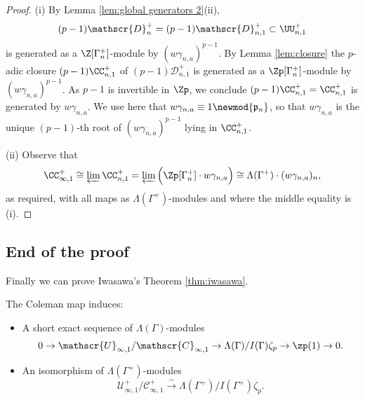 \documentclass[a4paper,10pt, english, reqno]{smfart}
\newcommand{\GG}{\Gamma}
\numberwithin{equation}{section}
\begin{document}
\begin{proof}
(i) By Lemma \ref{lem:global generators 2}(ii), 
\[
    (p-1)\mathscr{D}_{n}^+ = (p-1)\mathscr{D}_{n,1}^+ \subset \UU_{n,1}^+
\]
is generated as a $\Z[\Gamma^+_n]$-module by $(w\gamma_{n,a})^{p-1}$.  By Lemma \ref{lem:closure} the $p$-adic closure $(p-1)\CC_{n,1}^+$ of $(p-1)\mathscr{D}_{n,1}^+$ is generated as a $\Zp[\Gamma^+_n]$-module by $(w\gamma_{n,a})^{p-1}$. As $p-1$ is invertible in $\Zp$, we conclude $(p-1)\CC_{n,1}^+ = \CC_{n,1}^+$ is generated by $w\gamma_{n,a}$. We use here that $w\gamma_{n,a} \equiv 1 \newmod{\mathfrak{p}_n}$, so that $w\gamma_{n,a}$ is the unique $(p-1)$-th root of $(w\gamma_{n,a})^{p-1}$ lying in $\CC_{n,1}^+$.



(ii) Observe that
\[
    \CC_{\infty,1}^+ \cong \varprojlim \CC_{n,1}^+ = \varprojlim \Big(\Zp[\Gamma_n^+]\cdot w\gamma_{n,a}\Big)\cong \Lambda(\Gamma^+)\cdot (w\gamma_{n,a})_n,
\]
as required, with all maps as $\Lambda(\Gamma^+)$-modules and where the middle equality is (i).
\end{proof}



\subsection{End of the proof}

Finally we can prove Iwasawa's Theorem \ref{thm:iwasawa}.


\begin{theorem} \label{thm:iwasawa 2}
	The Coleman map induces:
	\begin{itemize}
 \item[(i)] A short exact sequence of $\Lambda(\GG)$-modules
		\[ 0 \to \mathscr{U}_{\infty, 1} / \mathscr{C}_{\infty, 1} \to \Lambda(\GG) / I(\GG) \zeta_p \to \zp(1) \to 0. \]
		\item[(ii)] An isomorphism of $\Lambda(\GG^+)$-modules
		\[ \mathscr{U}^+_{\infty, 1} / \mathscr{C}^+_{\infty, 1} \xrightarrow{\sim} \Lambda(\GG^+) / I(\GG^+) \zeta_p. \]
	\end{itemize}
\end{theorem}
\end{document}
